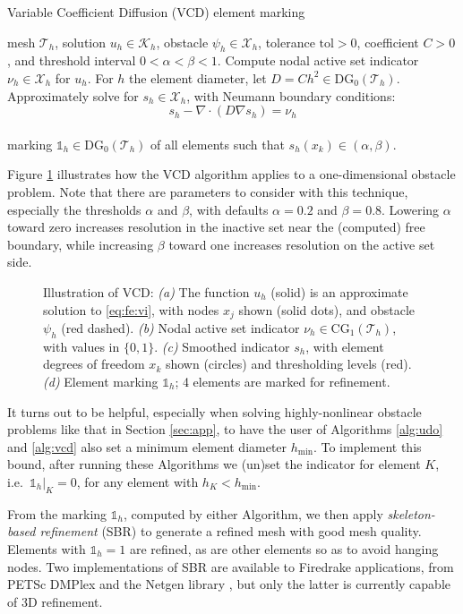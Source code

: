 \documentclass[]{interact}
\theoremstyle{plain}%
\theoremstyle{definition}
\theoremstyle{remark}
\newcommand{\grad}{\nabla}
\newcommand{\Div}{\nabla\cdot}
\newcommand{\cK}{\mathcal{K}}
\newcommand{\cT}{\mathcal{T}}
\newcommand{\cX}{\mathcal{X}}
\newcommand{\CG}{\text{CG}}
\newcommand{\DG}{\text{DG}}
\newcommand{\hmin}{h_{\min}}
\newcommand{\oneh}{\mathbb{1}_h}
\begin{document}
\begin{algorithm}[ht]
	\caption{Variable Coefficient Diffusion (VCD) element marking}
	\begin{algorithmic}[1]
		\Require mesh $\cT_h$, solution $u_h \in \cK_h$, obstacle $\psi_h \in \cX_h$, tolerance $\text{tol} > 0$, coefficient $C>0$, and threshold interval $0 < \alpha < \beta < 1$.
		\State Compute nodal active set indicator $\nu_h \in \cX_h$ for $u_h$.
		\State For $h$ the element diameter, let $D=C h^2 \in \DG_0(\cT_h)$.
		\State Approximately solve for $s_h\in\cX_h$, with Neumann boundary conditions:
		  $$s_h - \Div(D \grad s_h) = \nu_h$$ \\
		\Return marking $\oneh \in \DG_0(\cT_h)$ of all elements such that $s_h(x_k) \in (\alpha,\beta)$.
    \end{algorithmic}
\label{alg:vcd}
\end{algorithm}

Figure \ref{fig:vcdillustration} illustrates how the VCD algorithm applies to a one-dimensional obstacle problem.  Note that there are parameters to consider with this technique, especially the thresholds $\alpha$ and $\beta$, with defaults $\alpha=0.2$ and $\beta=0.8$.  Lowering $\alpha$ toward zero increases resolution in the inactive set near the (computed) free boundary, while increasing $\beta$ toward one increases resolution on the active set side.

\begin{figure}[ht]

\caption{Illustration of VCD: \emph{(a)} The function $u_h$ (solid) is an approximate solution to \eqref{eq:fe:vi}, with nodes $x_j$ shown (solid dots), and obstacle $\psi_h$ (red dashed).  \emph{(b)} Nodal active set indicator $\nu_h \in \CG_1(\cT_h)$, with values in $\{0,1\}$.  \emph{(c)} Smoothed indicator $s_h$, with element degrees of freedom $x_k$ shown (circles) and thresholding levels (red).  \emph{(d)} Element marking $\oneh$; 4 elements are marked for refinement.}
\label{fig:vcdillustration}
\end{figure}

It turns out to be helpful, especially when solving highly-nonlinear obstacle problems like that in Section \ref{sec:app}, to have the user of Algorithms \ref{alg:udo} and \ref{alg:vcd} also set a minimum element diameter $\hmin$.  To implement this bound, after running these Algorithms we (un)set the indicator for element $K$, i.e.~$\oneh|_K=0$, for any element with $h_K < \hmin$.

From the marking $\oneh$, computed by either Algorithm, we then apply \emph{skeleton-based refinement} (SBR) \cite{PlazaCarey2000} to generate a refined mesh with good mesh quality.  Elements with $\oneh=1$ are refined, as are other elements so as to avoid hanging nodes.  Two implementations of SBR are available to Firedrake applications, from PETSc DMPlex \cite{petsc-user-ref} and the Netgen library \cite{Betteridgeetal2024}, but only the latter is currently capable of 3D refinement.
\end{document}
